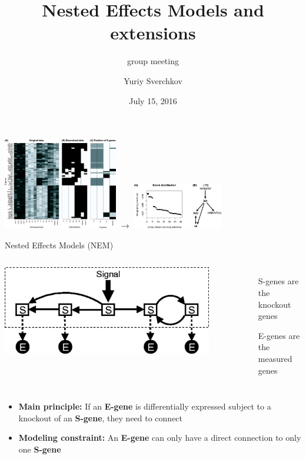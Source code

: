 \documentclass{beamer}
\title{Nested Effects Models and extensions}
\subtitle{group meeting}
\date{July 15, 2016}
\author{Yuriy Sverchkov}
\institute{University of Wisconsin--Madison}
\begin{document}
\begin{frame}[plain]
  \titlepage
\end{frame}

\begin{frame}[plain]
\includegraphics[valign=c,height=4cm,trim={0 0 22cm 0}, clip]{F3_large.jpg}
\hfill {\Huge $\rightarrow$} \hfill
\includegraphics[valign=c,height=2cm,trim={30cm 0 0 0}, clip]{F4_large.jpg}

\scriptsize {}
\end{frame}

\begin{frame}{Nested Effects Models (NEM)}
\begin{columns}
\includegraphics[width=0.9\textwidth]{F1_large.jpg}

\begin{itemize}
  \item[S-genes] are the knockout genes
  \item[E-genes] are the measured genes
\end{itemize}
\end{columns}
\pause
\begin{itemize}
  \item \textbf{Main principle:} If an \textbf{E-gene} is differentially expressed subject to a knockout of an \textbf{S-gene}, they need to connect
  \item \textbf{Modeling constraint:} An \textbf{E-gene} can only have a direct connection to only one \textbf{S-gene}
\end{itemize}
\end{frame}
\end{document}
